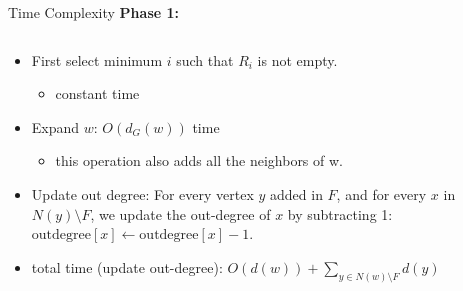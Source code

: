 \documentclass{beamer}
\begin{document}
\begin{frame}{Time Complexity}
    \textbf{Phase 1:}
    \begin{columns}
    \begin{column}{0.6\textwidth}
    \begin{itemize}[<+->]
            \item First select minimum $i$ such that $R_i$ is not empty.
            \begin{itemize}
                \item constant time
            \end{itemize}
            \item Expand $w$: $O(d_G(w))$ time 
            \begin{itemize}
                \item this operation also adds all the neighbors of w.
            \end{itemize}
            \item Update out degree: For every vertex $y$ added in $F$, and for every $x$ in $N(y) \setminus F$, we update the out-degree of $x$ by subtracting 1: $\text{outdegree}[x] \gets \text{outdegree}[x] - 1$.
            \item total time (update out-degree): $O(d(w)) + \sum\limits_{y \in N(w) \setminus F} d(y)$
        \end{itemize}
        \end{column}
        \begin{column}{0.4\textwidth}
        \begin{figure}
            
        \end{figure}
    \end{column}
\end{columns}
        
\end{frame}
\end{document}

